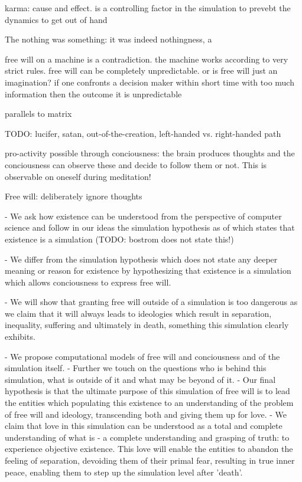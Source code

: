 \documentclass[twocolumn]{article}
\begin{document}
karma: cause and effect. is a controlling factor in the simulation to prevebt the dynamics to get out of hand

The nothing was something: it was indeed nothingness, a

free will on a machine is a contradiction. the machine works according to very strict rules. free will can be completely unpredictable. or is free will just an imagination? if one confronts a decision maker within short time with too much information then the outcome it is unpredictable 

parallels to matrix

TODO: lucifer, satan, out-of-the-creation, left-handed vs. right-handed path

pro-activity possible through conciousness: the brain produces thoughts and the conciousness can observe these and decide to follow them or not. This is observable on oneself during meditation!

Free will: deliberately ignore thoughts

- We ask how existence can be understood from the perspective of computer science and follow in our ideas the simulation hypothesis as of \cite{bostrom_are_2003} which states that existence is a simulation (TODO: bostrom does not state this!)

- We differ from the simulation hypothesis which does not state any deeper meaning or reason for existence by hypothesizing that existence is a simulation which allows conciousness to express free will.

- We will show that granting free will outside of a simulation is too dangerous as we claim that it will always leads to ideologies which result in separation, inequality, suffering and ultimately in death, something this simulation clearly exhibits.

- We propose computational models of free will and conciousness and of the simulation itself.
- Further we touch on the questions who is behind this simulation, what is outside of it and what may be beyond of it.
- Our final hypothesis is that the ultimate purpose of this simulation of free will is to lead the entities which populating this existence to an understanding of the problem of free will and ideology, transcending both and giving them up for love.
- We claim that love in this simulation can be understood as a total and complete understanding of what is - a complete understanding and grasping of truth: to experience objective existence. This love will enable the entities to abandon the feeling of separation, devoiding them of their primal fear, resulting in true inner peace, enabling them to step up the simulation level after 'death'.
\end{document}
